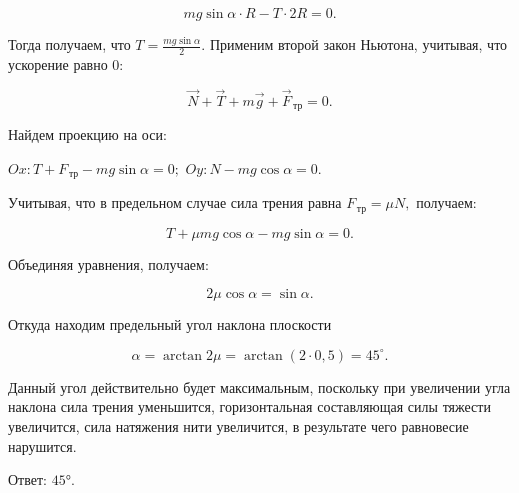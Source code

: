 \documentclass[12pt,a4paper]{article}
\begin{document}
{\[mg \sin \alpha \cdot R - T \cdot 2R=0.\]

Тогда получаем, что $T= \frac{mg \sin \alpha}{2} .$
Применим второй закон Ньютона, учитывая, что ускорение равно $0$:

\[\vec N + \vec T + m\vec g + \vec F_{\,\text{тр}}=0.\]

Найдем проекцию на оси:

$Ox:T + F_{\,\text{тр}} - mg \sin \alpha =0;$
$Oy:N - mg \cos \alpha =0.$

Учитывая, что в предельном случае сила трения равна $F_{\,\text{тр}}=\mu N,$ получаем:

\[T + \mu mg \cos \alpha - mg \sin \alpha =0.\]

Объединяя уравнения, получаем:

\[2\mu \cos \alpha = \sin \alpha .\]

Откуда находим предельный угол наклона плоскости

\[\alpha = \arctan 2\mu= \arctan ( 2 \cdot 0{,}5 ) =45 ^\circ .\]

Данный угол действительно будет максимальным, поскольку при увеличении угла наклона сила трения уменьшится, горизонтальная составляющая силы тяжести увеличится, сила натяжения нити увеличится, в результате чего равновесие нарушится.

Ответ: $45$°.
}
\end{document}
